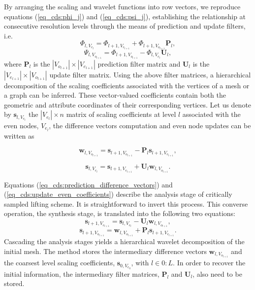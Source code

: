 \documentclass[graybox]{svmult}
\begin{document}
	
	By arranging the scaling and wavelet functions into row vectors, we reproduce equations (\ref{eq_cds:phi_j}) and (\ref{eq_cds:psi_j}), establishing the relationship at consecutive resolution levels through the means of prediction and update filters, i.e.
	\begin{equation}
	\Phi_{l,V_{e_l}} = \Phi_{l+1,V_{e_{l+1}}} +  \Phi_{l+1, V_{o_{l+1}}} \mathbf{P}_l,
	\label{eq_cds:prediction_functions}
	\end{equation}
	\begin{equation}
	\Psi_{l,V_{o_{l+1}}} = \Phi_{l+1,V_{o_{l+1}}} - \Phi_{l,V_{e_l}}  \mathbf{U}_l,
	\label{eq_cds:update_functions}
	\end{equation}
	where $\mathbf{P}_l$ is the $|V_{o_{l+1}}| \times |V_{e_{l+1}}|$ prediction filter matrix and $\mathbf{U}_l$ is the  $|V_{e_{l+1}}| \times |V_{o_{l+1}}|$ update filter matrix.
	Using the above filter matrices, a hierarchical decomposition of the scaling coefficients associated with the vertices of a mesh or a graph can be inferred. These vector-valued coefficients contain both the geometric and attribute coordinates of their corresponding vertices. Let us denote by $\mathbf{s}_{l,V_{e_l}}$ the $|V_{e_l}| \times n$ matrix of scaling coefficients at level $l$ associated with the even nodes, $V_{e_l}$, the difference vectors computation and even node updates can be written as
	
	\begin{equation}
	\mathbf{w}_{l,V_{o_{l+1}}} = \mathbf{s}_{l+1,V_{o_{l+1}}} - \mathbf{P}_l \mathbf{s}_{l+1,V_{e_{l+1}}},
	\label{eq_cds:prediction_difference_vectors} 
	\end{equation}
	
	\begin{equation}
	\mathbf{s}_{l,V_{e_l}} = \mathbf{s}_{l+1,V_{e_{l+1}}} + \mathbf{U}_l \mathbf{w}_{l,V_{o_{l+1}}}.
	\label{eq_cds:update_even_coefficients}
	\end{equation}
	
	Equations (\ref{eq_cds:prediction_difference_vectors}) and (\ref{eq_cds:update_even_coefficients}) describe the analysis stage of critically sampled lifting scheme. It is straightforward
	to invert this process. This converse operation, the synthesis stage, is translated into the following two equations:
	\begin{equation}
	\mathbf{s}_{l+1,V_{e_{l+1}}} = \mathbf{s}_{l,V_{e_l}} - \mathbf{U}_l \mathbf{w}_{l,V_{o_{l+1}}},
	\label{eq_cds:synthesis_odd}
	\end{equation}
	\begin{equation}
	\mathbf{s}_{l+1,V_{o_{l+1}}} = \mathbf{w}_{l,V_{o_{l+1}}} + \mathbf{P}_l \mathbf{s}_{l+1,V_{e_{l+1}}}.
	\label{eq_cds:synthesis_even}
	\end{equation}
	Cascading the analysis stages yields a hierarchical wavelet decomposition of the initial mesh. The method stores the intermediary difference vectors $\mathbf{w}_{l,V_{o_{l+1}}}$ and the 
	coarsest level scaling coefficients, $\mathbf{s}_{0, V_{e_0}}$, with $l \in {0:L}$. In order to recover the initial information, the intermediary filter matrices, $\mathbf{P}_l$ and
	$\mathbf{U}_l$, also need to be stored.
	
\end{document}
